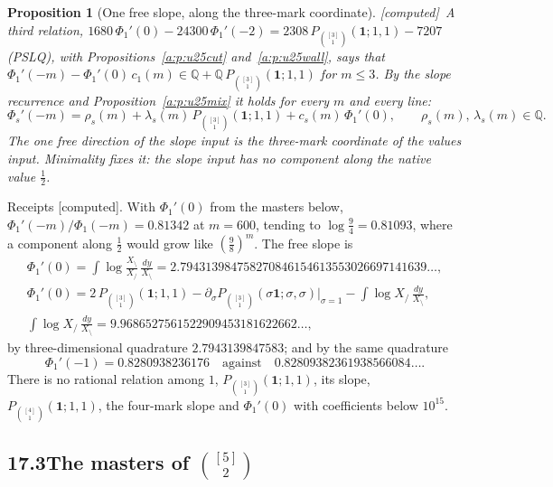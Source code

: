 \documentclass[11pt]{article}
\newcommand{\one}{\mathbf 1}
\newcommand{\Pth}{P_{\binom{[3]}1}(\one;1,1)}
\newcommand{\Pfour}{P_{\binom{[4]}1}(\one;1,1)}
\theoremstyle{plain}
\newtheorem{proposition}{Proposition}[section]
\theoremstyle{definition}
\theoremstyle{remark}
\newcommand{\computed}{\textup{[computed]}}
\begin{document}
\begin{proposition}[One free slope, along the three-mark coordinate]\label{a:p:u25free}\computed\
A third relation, $1680\,\Phi_1'(0)-24300\,\Phi_1'(-2)=2308\,\Pth-7207$ (PSLQ), with Propositions~\ref{a:p:u25cut} and~\ref{a:p:u25wall}, says that $\Phi_1'(-m)-\Phi_1'(0)\,c_1(m)\in\mathbb Q+\mathbb Q\,\Pth$ for $m\le3$. By the slope recurrence and Proposition~\ref{a:p:u25mix} it holds for every $m$ and every line:
\[
\Phi_s'(-m)=\rho_s(m)+\lambda_s(m)\,\Pth+c_s(m)\,\Phi_1'(0),\qquad \rho_s(m),\,\lambda_s(m)\in\mathbb Q .
\]
The one free direction of the slope input is the three-mark coordinate of the values input. Minimality fixes it: the slope input has no component along the native value $\frac12$.
\end{proposition}

\noindent Receipts \computed. With $\Phi_1'(0)$ from the masters below, $\Phi_1'(-m)/\Phi_1(-m)=0.81342$ at $m=600$, tending to $\log\frac94=0.81093$, where a component along $\frac12$ would grow like $(\frac98)^m$. The free slope is
\begin{gather*}
\Phi_1'(0)=\int\log\frac{X_{\setminus}}{X_{/}}\,\frac{dy}{X_{\setminus}}=2.794313984758270846154613553026697141639\ldots,\\
\Phi_1'(0)=2\,\Pth-\partial_\sigma P_{\binom{[3]}1}(\sigma\one;\sigma,\sigma)\big|_{\sigma=1}-\int\log X_{/}\,\frac{dy}{X_{\setminus}},\\
\int\log X_{/}\,\frac{dy}{X_{\setminus}}=9.9686527561522909453181622662\ldots,
\end{gather*}
by three-dimensional quadrature $2.7943139847583$; and by the same quadrature
\[
\Phi_1'(-1)=0.8280938236176\quad\text{against}\quad0.82809382361938566084\ldots .
\]
There is no rational relation among $1$, $\Pth$, its slope, $\Pfour$, the four-mark slope and $\Phi_1'(0)$ with coefficients below $10^{15}$.

\subsection*{17.3\quad The masters of $\binom{[5]}2$}
\end{document}
